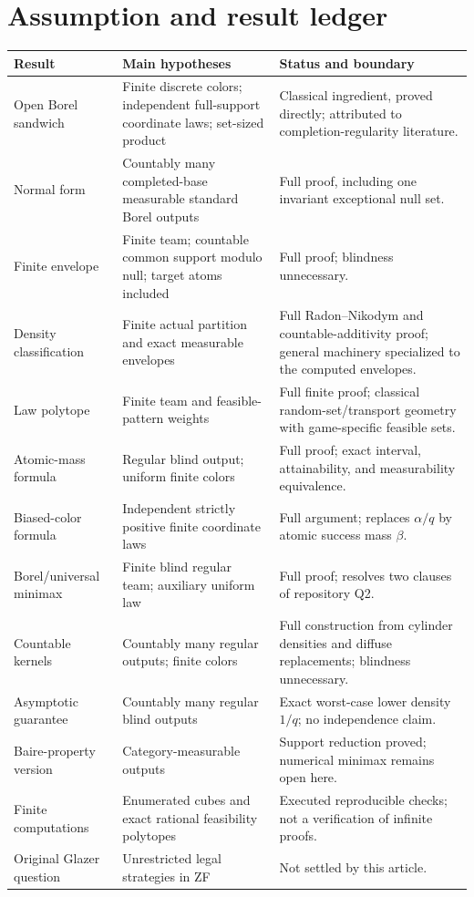 \documentclass[11pt,letterpaper]{article}
\theoremstyle{definition}
\begin{document}
\setcounter{section}{5}
\renewcommand{\thesection}{\Alph{section}}
\renewcommand{\theHsection}{ext.app.\Alph{section}}
\makeatletter\gdef\Hy@chapapp{\Hy@appendixstring}\makeatother
\section{Assumption and result ledger}
\label{mbg:ext:app:ledger}

\begin{longtable}{>{\raggedright\arraybackslash}p{}>{\raggedright\arraybackslash}p{}>{\raggedright\arraybackslash}p{}}
\toprule
Result & Main hypotheses & Status and boundary\\
\midrule
\endhead
Open Borel sandwich & Finite discrete colors; independent full-support coordinate laws; set-sized product & Classical ingredient, proved directly; attributed to completion-regularity literature.\\[4pt]
Normal form & Countably many completed-base measurable standard Borel outputs & Full proof, including one invariant exceptional null set.\\[4pt]
Finite envelope & Finite team; countable common support modulo null; target atoms included & Full proof; blindness unnecessary.\\[4pt]
Density classification & Finite actual partition and exact measurable envelopes & Full Radon--Nikodym and countable-additivity proof; general machinery specialized to the computed envelopes.\\[4pt]
Law polytope & Finite team and feasible-pattern weights & Full finite proof; classical random-set/transport geometry with game-specific feasible sets.\\[4pt]
Atomic-mass formula & Regular blind output; uniform finite colors & Full proof; exact interval, attainability, and measurability equivalence.\\[4pt]
Biased-color formula & Independent strictly positive finite coordinate laws & Full argument; replaces $\alpha/q$ by atomic success mass $\beta$.\\[4pt]
Borel/universal minimax & Finite blind regular team; auxiliary uniform law & Full proof; resolves two clauses of repository Q2.\\[4pt]
Countable kernels & Countably many regular outputs; finite colors & Full construction from cylinder densities and diffuse replacements; blindness unnecessary.\\[4pt]
Asymptotic guarantee & Countably many regular blind outputs & Exact worst-case lower density $1/q$; no independence claim.\\[4pt]
Baire-property version & Category-measurable outputs & Support reduction proved; numerical minimax remains open here.\\[4pt]
Finite computations & Enumerated cubes and exact rational feasibility polytopes & Executed reproducible checks; not a verification of infinite proofs.\\[4pt]
Original Glazer question & Unrestricted legal strategies in ZF & Not settled by this article.\\
\bottomrule
\end{longtable}
\end{document}
